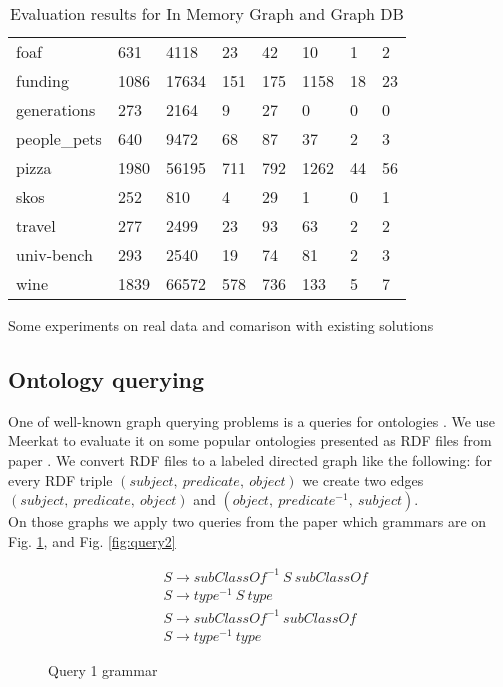 \begin{table*}[t]
\begin{tabular}{|l|l|lll|lll|}
foaf                        & 631  & 4118  & 23  & 42  & 10   & 1  & 2  \\
funding                     & 1086 & 17634 & 151 & 175 & 1158 & 18 & 23 \\
generations                 & 273  & 2164  & 9   & 27  & 0    & 0  & 0  \\
people\_pets                & 640  & 9472  & 68  & 87  & 37   & 2  & 3  \\
pizza                       & 1980 & 56195 & 711 & 792 & 1262 & 44 & 56 \\
skos                        & 252  & 810   & 4   & 29  & 1    & 0  & 1  \\
travel                      & 277  & 2499  & 23  & 93  & 63   & 2  & 2  \\
univ-bench                  & 293  & 2540  & 19  & 74  & 81   & 2  & 3  \\
wine                        & 1839 & 66572 & 578 & 736 & 133  & 5  & 7  \\
\hline
\end{tabular}
\caption{Evaluation results for In Memory Graph and Graph DB}
\label{table:rdfs}
\end{table*}

Some experiments on real data and comarison with existing solutions

\subsection{Ontology querying}
\label{sec:ontology}

One of well-known graph querying problems is a queries for ontologies \cite{FndDB}. We use Meerkat to evaluate
it on some popular ontologies presented as RDF files from paper \cite{CFGonRDF}. We convert RDF files to a labeled directed graph like the following: for every RDF triple $(subject,\ predicate,\ object)$ we create two edges $(subject,\ predicate,\ object)$ and $(object,\ predicate^{-1},\ subject)$.\\
On those graphs we apply two queries from the paper \cite{GrigorevR16} which grammars are on Fig. \ref{fig:query1}, and Fig.  \ref{fig:query2} 
\begin{figure}[h]
\begin{align*}
& S \rightarrow subClassOf^{-1}\ S\ subClassOf\\
& S \rightarrow type^{-1}\ S\ type\\
& S \rightarrow subClassOf^{-1}\ subClassOf\\
& S \rightarrow type^{-1}\ type
\end{align*}
\caption{Query 1 grammar}
\label{fig:query1}
\end{figure}

